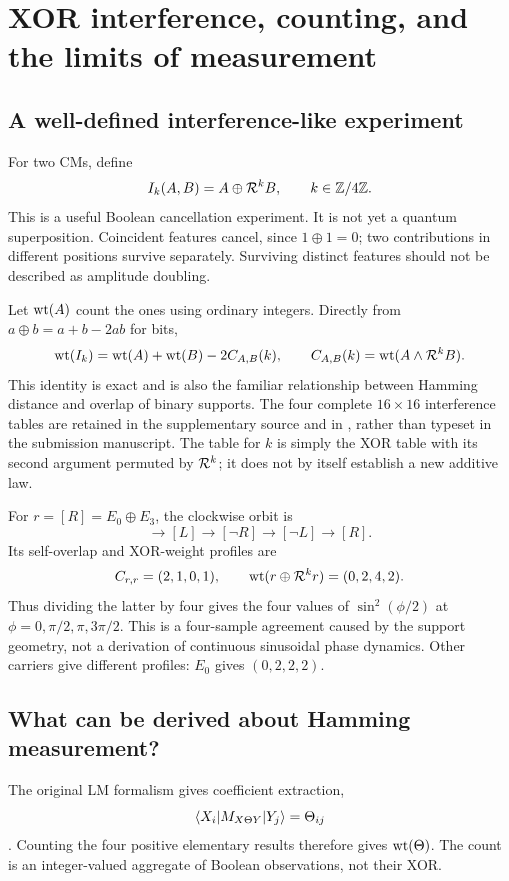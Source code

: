 \section{XOR interference, counting, and the limits of measurement}\label{sec:boolean}
\subsection{A well-defined interference-like experiment}
For two CMs, define
\begin{equation}
 I_k(A,B)=A\oplus\mathcal R^kB,\qquad k\in\mathbb Z/4\mathbb Z.
\end{equation}
This is a useful Boolean cancellation experiment. It is not yet a quantum superposition. Coincident features cancel, since $1\oplus1=0$; two contributions in different positions survive separately. Surviving distinct features should not be described as amplitude doubling.

Let $\operatorname{wt}(A)$ count the ones using ordinary integers. Directly from $a\oplus b=a+b-2ab$ for bits,
\begin{equation}\label{eq:xorweight}
 \operatorname{wt}(I_k)=\operatorname{wt}(A)+\operatorname{wt}(B)-2C_{A,B}(k),\qquad
 C_{A,B}(k)=\operatorname{wt}(A\land\mathcal R^kB).
\end{equation}
This identity is exact and is also the familiar relationship between Hamming distance and overlap of binary supports. The four complete $16\times16$ interference tables are retained in the supplementary source and in , rather than typeset in the submission manuscript. The table for $k$ is simply the XOR table with its second argument permuted by $\mathcal R^k$; it does not by itself establish a new additive law.

For $r=[R]=E_0\oplus E_3$, the clockwise orbit is
\begin{equation}
 [R]\longrightarrow[L]\longrightarrow[\neg R]\longrightarrow[\neg L]\longrightarrow[R].
\end{equation}
Its self-overlap and XOR-weight profiles are
\begin{equation}
 C_{r,r}=(2,1,0,1),\qquad \operatorname{wt}(r\oplus\mathcal R^kr)=(0,2,4,2).
\end{equation}
Thus dividing the latter by four gives the four values of $\sin^2(\phi/2)$ at $\phi=0,\pi/2,\pi,3\pi/2$. This is a four-sample agreement caused by the support geometry, not a derivation of continuous sinusoidal phase dynamics. Other carriers give different profiles: $E_0$ gives $(0,2,2,2)$.

\subsection{What can be derived about Hamming measurement?}
The original LM formalism gives coefficient extraction,
\begin{equation}
 \langle X_i\rvert M_{X\Theta Y}\lvert Y_j\rangle=\Theta_{ij}
\end{equation}
\cite[Section 4.1.4]{droncheff}. Counting the four positive elementary results therefore gives $\operatorname{wt}(\Theta)$. The count is an integer-valued aggregate of Boolean observations, not their XOR.


